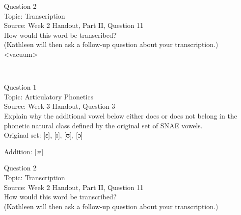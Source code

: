 \documentclass[12pt]{article}
\begin{document}
\newpage

{\large Question 2}\\

Topic: Transcription\\
Source: Week 2 Handout, Part II, Question 11\\

How would this word be transcribed?\\ (Kathleen will then ask a follow-up question about your transcription.)\\

<vacuum>


\newpage

\begin{center}
\textbf{{\color{red}{\HUGE END OF EXAM}}}\\

\end{center}
\newpage

\begin{center}
\textbf{{\color{blue}{\HUGE START OF EXAM\\}}}

\textbf{{\color{blue}{\HUGE Student ID: 34236\\}}}

\textbf{{\color{blue}{\HUGE 9:50\\}}}

\end{center}
\newpage

{\large Question 1}\\

Topic: Articulatory Phonetics\\
Source: Week 3 Handout, Question 3\\

Explain why the additional vowel below either does or does not belong in the phonetic natural class defined by the original set of SNAE vowels.\\

Original set: {[ɛ]}, {[ɪ]}, {[ʊ]}, {[ɔ]}

Addition: {[æ]}


\newpage

{\large Question 2}\\

Topic: Transcription\\
Source: Week 2 Handout, Part II, Question 11\\

How would this word be transcribed?\\ (Kathleen will then ask a follow-up question about your transcription.)\\
\end{document}
